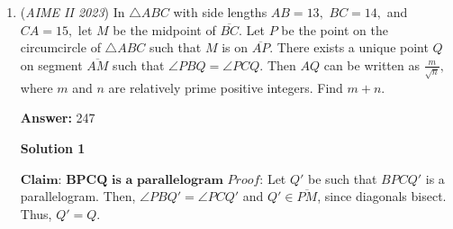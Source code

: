\begin{enumerate}
 Following casework on the number of 2-element subsets:

 If $N=1$: There are $\binom{5}{2}=10$ ways.

 If $N=2$: There are $5$ ways to choose the intersection between the 2 sets (remember they have to have at least one element of intersection) and $\binom{4}{2}=6$ ways to choose the distinct elements in the subsets, so there are $5*6=30$ ways.

 If $N=3$: It can be a cycle, where WLOG let the elements be $a,b,c$ so the sets are $\{a,b\}$, $\{b,c\}$, and $\{c,a\}$. This is just $\binom{5}{3}=10$. Alternatively, it can also be the case where all sets share one element. There are 5 ways to choose this element and $\binom{4}{2}=6$ ways to choose the remaining elements to assign to each set. There are $30$ ways.

 If $N=4$: By the Pigeonhole Principle, the only way all pairwise sets have at one common intersection is if all share one element in common. There are 5 ways to choose this element and the remaining numbers are forced. There are 5 ways.

 $N\geq{5}$ does not provide any valid cases since to have all pairwise elements to intersect one element, they must be the same element by the Pigeonhole Principle, but there are not enough subsets.

 If $N=0$, then there is only one way since $\binom{5}{3}+\binom{5}{4}+\binom{5}{5}=16$.

 Adding all cases yields $5+10+30+30+5+1=\boxed{81}$ ways!

 -Magnetoninja

 (skip to 1:32:49)

 


	\item (\textit{AIME II 2023}) In $\triangle ABC$ with side lengths $AB = 13,$ $BC = 14,$ and $CA = 15,$ let $M$ be the midpoint of $\overline{BC}.$ Let $P$ be the point on the circumcircle of $\triangle ABC$ such that $M$ is on $\overline{AP}.$ There exists a unique point $Q$ on segment $\overline{AM}$ such that $\angle PBQ = \angle PCQ.$ Then $AQ$ can be written as $\frac{m}{\sqrt{n}},$ where $m$ and $n$ are relatively prime positive integers. Find $m+n.$

 \textbf{Answer: }247



\textbf{Solution 1}

$\textbf{Claim: BPCQ is a parallelogram}$
$\textit{Proof}$: Let $Q'$ be such that $BPCQ'$ is a parallelogram. Then, $\angle PBQ' = \angle PCQ'$ and $Q' \in \overline{PM}$, since diagonals bisect. Thus, $Q'=Q$.


\end{enumerate}
